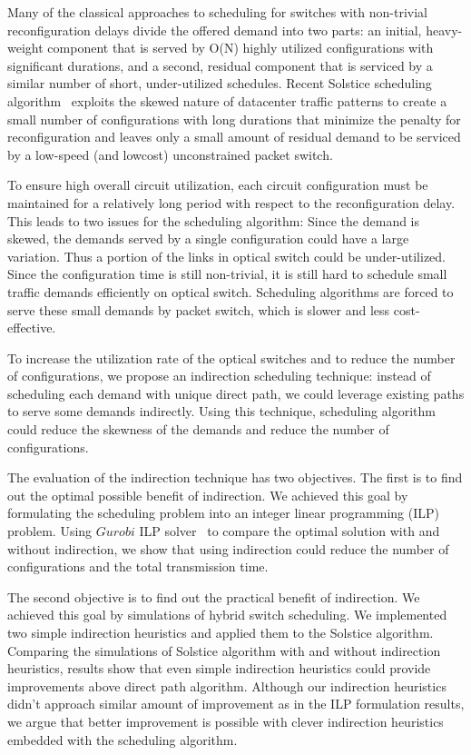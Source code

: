 Many of the classical approaches to scheduling for switches with
non-trivial reconfiguration delays divide the offered demand into two
parts: an initial, heavy-weight component that is served by O(N) highly
utilized configurations with significant durations, and a second,
residual component that is serviced by a similar number of short,
under-utilized schedules. Recent Solstice scheduling
algorithm~\cite{Liu:2014} exploits the skewed nature of datacenter
traffic patterns to create a small number of configurations with long
durations that minimize the penalty for reconfiguration and leaves only
a small amount of residual demand to be serviced by a low-speed (and
lowcost) unconstrained packet switch.

To ensure high overall circuit utilization, each circuit configuration
must be maintained for a relatively long period with respect to the
reconfiguration delay. This leads to two issues for the scheduling
algorithm: Since the demand is skewed, the demands served by a single
configuration could have a large variation. Thus a portion of the links
in optical switch could be under-utilized. Since the configuration time
is still non-trivial, it is still hard to schedule small traffic demands
efficiently on optical switch. Scheduling algorithms are forced to serve
these small demands by packet switch, which is slower and less
cost-effective.

To increase the utilization rate of the optical switches and to reduce the
number of configurations, we propose an indirection scheduling technique: instead
of scheduling each demand with unique direct path, we could leverage existing
paths to serve some demands indirectly. Using this technique, scheduling algorithm
could reduce the skewness of the demands and reduce the number of configurations.

The evaluation of the indirection technique has two objectives. The
first is to find out the optimal possible benefit of indirection. We
achieved this goal by formulating the scheduling problem into an integer
linear programming (ILP) problem. Using $Gurobi$ ILP
solver~\cite{Gurobi} to compare the optimal solution with and without
indirection, we show that using indirection could reduce the number of
configurations and the total transmission time.

The second objective is to find out the practical benefit of indirection.
We achieved this goal by simulations of hybrid switch scheduling. We implemented
two simple indirection heuristics and applied them to the Solstice algorithm.
Comparing the simulations of Solstice algorithm with and without
indirection heuristics, results show that even simple indirection
heuristics could provide improvements above direct path algorithm.
Although our indirection heuristics didn't approach similar amount
of improvement as in the ILP formulation results, we argue that better
improvement is possible with clever indirection heuristics embedded with
the scheduling algorithm.

